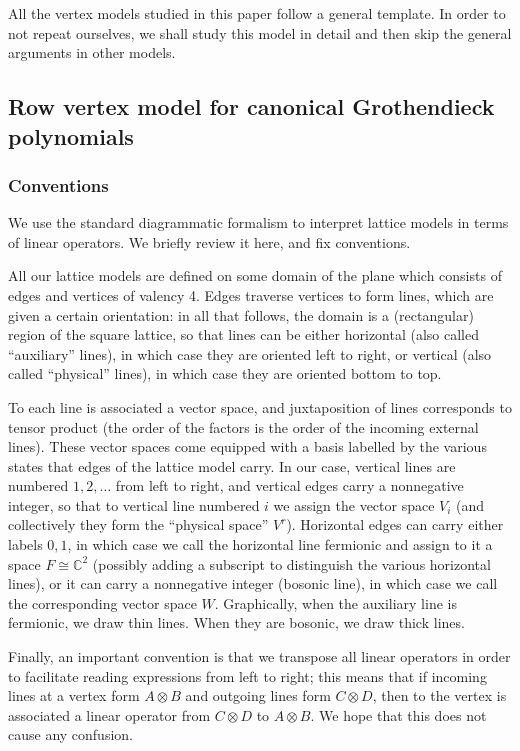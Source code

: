 \documentclass[ALCO, Unicode]{cedram}
\newcommand\CC{{\mathbb C}}
\begin{document}
All the vertex models studied in this paper follow a general template. In order to not repeat ourselves, we shall study this model in detail and then skip the general arguments in other models.

\subsection{Row vertex model for canonical Grothendieck polynomials}
\label{rowcGmodel}
\subsubsection{Conventions}
We use the standard diagrammatic formalism to interpret lattice models in terms of linear operators. We briefly review it here, and fix conventions.

All our lattice models are defined on some domain of the plane which consists of edges and vertices of valency 4. Edges traverse vertices to form lines, which are given a certain orientation: in all that follows, the domain is a (rectangular) region of the square lattice, so that lines can be either horizontal (also called ``auxiliary'' lines), in which case they are oriented left to right, or vertical (also called ``physical'' lines), in which case they are oriented bottom to top.

To each line is associated a vector space, and juxtaposition of lines corresponds to tensor product (the order of the factors is the order of the incoming external lines). These vector spaces come equipped with a basis labelled by the various states that edges of the lattice model carry.
In our case, vertical lines are numbered $1,2,\ldots$ from left to right, and vertical edges carry a nonnegative integer, so that to vertical line numbered $i$ we assign the vector space $V_i$ (and collectively they form the ``physical space'' $V^r$). Horizontal edges can carry either labels $0,1$, in which case we call the horizontal line fermionic and assign to it a space $F\cong \CC^2$ (possibly adding a subscript to distinguish the various horizontal lines), or it can carry a nonnegative integer (bosonic line), in which case we call the corresponding vector space $W$.
Graphically, when the auxiliary line is fermionic, we draw thin lines. When they are bosonic, we draw thick lines.

Finally, an important convention is that we transpose all linear operators in order to facilitate reading expressions from left to right; this means that if incoming lines at a vertex form $A\otimes B$ and outgoing lines form $C\otimes D$, then to the vertex is associated a linear operator from $C\otimes D$ to $A\otimes B$. We hope that this does not cause any confusion.
\end{document}
